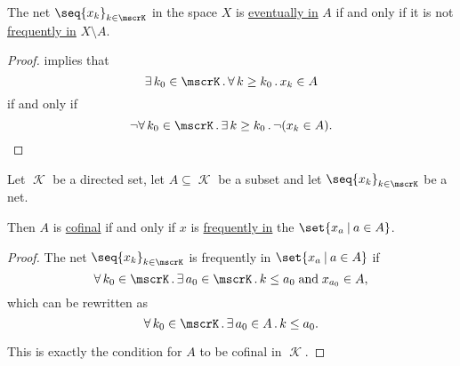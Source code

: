 \begin{proposition}\label{thm:eventually_and_frequently_in}
  The net \( \seq{ x_k }_{k \in \mscrK} \) in the space \( X \) is \hyperref[def:net_eventually_in]{eventually in} \( A \) if and only if it is not \hyperref[def:net_frequently_in]{frequently in} \( X \setminus A \).
\end{proposition}
\begin{proof}
   implies that
  \begin{equation*}
    \qexists {k_0 \in \mscrK} \qforall {k \geq k_0} x_k \in A
  \end{equation*}
  if and only if
  \begin{equation*}
    \neg \qforall {k_0 \in \mscrK} \qexists {k \geq k_0} \neg (x_k \in A).
  \end{equation*}
\end{proof}

\begin{proposition}\label{thm:cofinal_iff_frequently_in}
  Let \( \mscrK \) be a directed set, let \( A \subseteq \mscrK \) be a subset and let \( \seq{ x_k }_{k \in \mscrK} \) be a net.

  Then \( A \) is \hyperref[def:cofinal_set]{cofinal} if and only if \( x \) is \hyperref[def:net_frequently_in]{frequently in} the \( \set{ x_a \given a \in A } \).
\end{proposition}
\begin{proof}
  The net \( \seq{ x_k }_{k \in \mscrK} \) is frequently in \( \set{ x_a \given a \in A } \) if
  \begin{equation*}
    \qforall {k_0 \in \mscrK} \qexists {a_0 \in \mscrK} k \leq a_0 \T{and} x_{a_0} \in A,
  \end{equation*}
  which can be rewritten as
  \begin{equation*}
    \qforall {k_0 \in \mscrK} \qexists {a_0 \in A} k \leq a_0.
  \end{equation*}

  This is exactly the condition for \( A \) to be cofinal in \( \mscrK \).
\end{proof}

